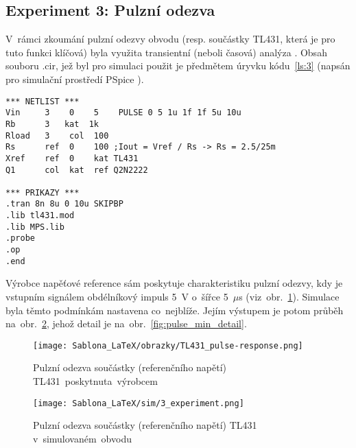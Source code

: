 \documentclass[12pt]{CLASS/protokol}
\begin{document}
    \subsection{Experiment 3: Pulzní odezva}\label{subsec:3}
        V~rámci zkoumání pulzní odezvy obvodu (resp. součástky TL431, která je pro tuto funkci klíčová) byla využita transientní (neboli časová) analýza \cite{Krejcirik2001}. Obsah souboru .cir, jež byl pro simulaci použit je předmětem úryvku kódu~\ref{ls:3} (napsán pro simulační prostředí PSpice \cite{pspice}).
        \vspace{.5 cm}
        \begin{lstlisting}[label=ls:3,caption=Obsah souboru .cir pro experiment 3]
*** NETLIST ***
Vin     3    0    5    PULSE 0 5 1u 1f 1f 5u 10u
Rb      3   kat  1k
Rload   3    col  100
Rs      ref  0    100 ;Iout = Vref / Rs -> Rs = 2.5/25m
Xref    ref  0    kat TL431
Q1      col  kat  ref Q2N2222

*** PRIKAZY ***
.tran 8n 8u 0 10u SKIPBP
.lib tl431.mod
.lib MPS.lib
.probe
.op
.end
        \end{lstlisting}

        \par
        Výrobce napěťové reference sám poskytuje charakteristiku pulzní odezvy, kdy je vstupním signálem obdélníkový impuls 5~V o~šířce 5~$\mu$s (viz~obr.~\ref{fig:TL431_pulse}). Simulace byla těmto podmínkám nastavena co~nejblíže. Jejím výstupem je potom průběh na~obr.~\ref{fig:pulse_sim}, jehož detail je na~obr.~\ref{fig:pulse_min_detail}.
        \begin{figure}[h!]
            \centering
            \texttt{[image: Sablona\_LaTeX/obrazky/TL431\_pulse-response.png]}
            \caption{Pulzní odezva součástky (referenčního napětí) TL431~poskytnuta~výrobcem \cite{TI_TL431_datasheet}}
            \label{fig:TL431_pulse}
        \end{figure}
        
        \newpage

        \begin{figure}[h]
            \centering
            \texttt{[image: Sablona\_LaTeX/sim/3\_experiment.png]}
            \caption{Pulzní odezva součástky (referenčního napětí) TL431 v~simulovaném~obvodu \cite{pspice}}
            \label{fig:pulse_sim}
        \end{figure}
\end{document}
